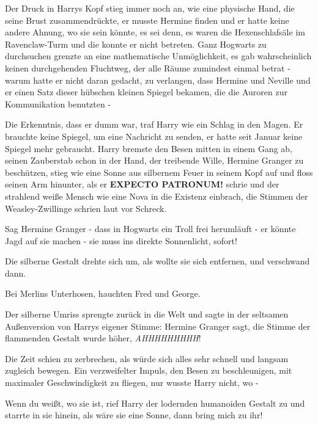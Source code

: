 Der Druck in Harrys Kopf stieg immer noch an, wie eine physische Hand, die seine
Brust zusammendrückte, er musste Hermine finden und er hatte keine andere
Ahnung, wo sie sein könnte, es sei denn, es waren die Hexenschlafsäle im
Ravenclaw-Turm und die konnte er nicht betreten. Ganz Hogwarts zu durchsuchen
grenzte an eine mathematische Unmöglichkeit, es gab wahrscheinlich keinen
durchgehenden Fluchtweg, der alle Räume zumindest einmal betrat - warum hatte er
nicht daran gedacht, zu verlangen, dass Hermine und Neville und er einen Satz
dieser hübschen kleinen Spiegel bekamen, die die Auroren zur Kommunikation
benutzten -

Die Erkenntnis, dass er dumm war, traf Harry wie ein Schlag in den Magen. Er
brauchte keine Spiegel, um eine Nachricht zu senden, er hatte seit Januar keine
Spiegel mehr gebraucht. Harry bremste den Besen mitten in einem Gang ab, seinen
Zauberstab schon in der Hand, der treibende Wille, Hermine Granger zu
beschützen, stieg wie eine Sonne aus silbernem Feuer in seinem Kopf auf und
floss seinen Arm hinunter, als er \glqq \textbf{EXPECTO PATRONUM!}\grqq{} schrie
und der strahlend weiße Mensch wie eine Nova in die Existenz einbrach, die
Stimmen der Weasley-Zwillinge schrien laut vor Schreck.

\glqq Sag Hermine Granger - dass in Hogwarts ein Troll frei herumläuft - er
könnte Jagd auf sie machen - sie muss ins direkte Sonnenlicht, sofort!\grqq{}

Die silberne Gestalt drehte sich um, als wollte sie sich entfernen, und
verschwand dann.

\glqq Bei Merlins Unterhosen\grqq{}, hauchten Fred und George.

Der silberne Umriss sprengte zurück in die Welt und sagte in der seltsamen
Außenversion von Harrys eigener Stimme: \glqq Hermine Granger sagt\grqq{}, die
Stimme der flammenden Gestalt wurde höher, \glqq \emph{AHHHHHHHHH}!\grqq{}

Die Zeit schien zu zerbrechen, als würde sich alles sehr schnell und langsam
zugleich bewegen. Ein verzweifelter Impuls, den Besen zu beschleunigen, mit
maximaler Geschwindigkeit zu fliegen, nur wusste Harry nicht, wo -

\glqq Wenn du weißt, wo sie ist\grqq{}, rief Harry der lodernden humanoiden
Gestalt zu und starrte in sie hinein, als wäre sie eine Sonne, \glqq dann bring
mich zu ihr!\grqq{}

